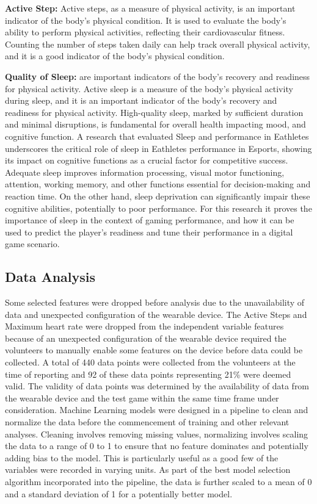 \textbf{Active Step:} Active steps, as a measure of physical activity, is an important indicator of the body's physical condition. It is
used to evaluate the body's ability to perform physical activities, reflecting their cardiovascular fitness. Counting the number of
steps taken daily can help track overall physical activity, and it is a good indicator of the body's physical condition. 


\textbf{Quality of Sleep:} are important indicators of the body's recovery and readiness for physical activity. Active sleep is a
measure of the body's physical activity during sleep, and it is an important indicator of the body's recovery and readiness for
physical activity. High-quality sleep, marked by sufficient duration and minimal disruptions, is fundamental for overall health
impacting mood, and cognitive function. A research that evaluated Sleep and performance in Eathletes \cite{BONNAR2019647} underscores the
critical role of sleep in Eathletes performance in Esports, showing its impact on cognitive functions as a crucial factor for
competitive success. Adequate sleep improves information processing, visual motor functioning, attention, working memory, and other
functions essential for decision-making and reaction time. On the other hand, sleep deprivation can significantly impair these
cognitive abilities, potentially to poor performance. For this research it proves the importance of sleep in the context of gaming
performance, and how it can be used to predict the player's readiness and tune their performance in a digital game scenario.




\subsection{Data Analysis}
Some selected features were dropped before analysis due to the unavailability of data and unexpected configuration of the wearable device. The Active Steps and
Maximum heart rate were dropped from the independent variable features because of an unexpected configuration of the wearable device required the volunteers
to manually enable some features on the device before data could be collected.
A total of 440 data points were collected from the volunteers at the time of reporting and 92 of these data points representing 21\% were deemed valid. 
The validity of data points was determined by the availability of data from the wearable device and the test game within the same time frame under 
consideration. 
Machine Learning models were designed in a pipeline to clean and normalize the data before the commencement of training and other relevant analyses. 
Cleaning involves removing missing values, normalizing involves scaling the data to a range of 0 to 1 to ensure that no feature dominates and potentially 
adding bias to the model. This is particularly useful as a good few of the variables were recorded in varying units. As part of the best model selection 
algorithm incorporated into the pipeline, the data is further scaled to a mean of 0 and a standard deviation of 1 for a potentially better model.

